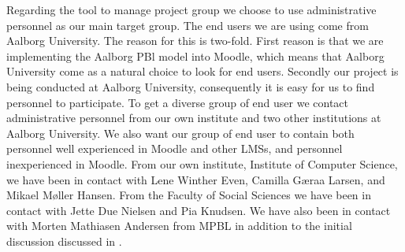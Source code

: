 Regarding the tool to manage project group we choose to use administrative personnel as our main target group.
The end users we are using come from Aalborg University.
The reason for this is two-fold.
First reason is that we are implementing the Aalborg PBl model into Moodle, which means that Aalborg University come as a natural choice to look for end users.
Secondly our project is being conducted at Aalborg University, consequently it is easy for us to find personnel to participate.
To get a diverse group of end user we contact administrative personnel from our own institute and two other institutions at Aalborg University.
We also want our group of end user to contain both personnel well experienced in Moodle and other LMSs, and personnel inexperienced in Moodle.
From our own institute, Institute of Computer Science, we have been in contact with Lene Winther Even, Camilla G\ae{}raa Larsen, and Mikael M\o{}ller Hansen.
From the Faculty of Social Sciences we have been in contact with  Jette Due Nielsen and Pia Knudsen.
We have also been in contact with Morten Mathiasen Andersen from MPBL in addition to the initial discussion discussed in .